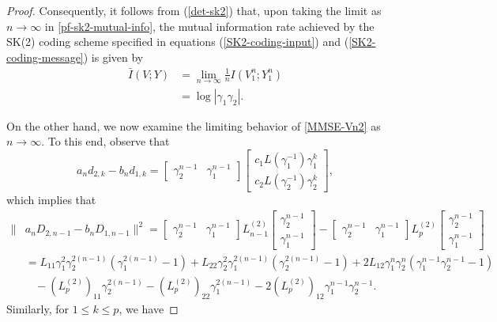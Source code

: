 \documentclass[12pt]{article}
\begin{document}
\begin{proof}
Consequently, it follows from (\ref{det-sk2}) that, upon taking the limit as $n\to\infty$ in \eqref{pf-sk2-mutual-info}, the mutual information rate achieved by the SK(2) coding scheme specified in equations (\ref{SK2-coding-input}) and (\ref{SK2-coding-message}) is given by
\begin{equation}\label{mutual-info-sk2-proof}
\begin{aligned}
            \bar{I}(V;Y)&=\lim_{n\to\infty}\frac{1}{n}I(V_1^n;Y_1^n)\\
            &= \log|\gamma_1 \gamma_2|.
\end{aligned}
\end{equation}

On the other hand, we now examine the limiting behavior of \eqref{MMSE-Vn2} as \(n \to \infty\). To this end, observe that
$$
a_nd_{2,k}-b_nd_{1,k}=\begin{bmatrix}\gamma_2^{n-1}&\gamma_1^{n-1}\end{bmatrix} \begin{bmatrix}
   c_1L(\gamma_1^{-1})\gamma_1^k \\[2pt]c_2L(\gamma_2^{-1})\gamma_2^k
\end{bmatrix},
$$
which implies that 
\begin{equation}\label{aD-bD}
\begin{aligned}
\|&a_nD_{2,n-1}-b_nD_{1,n-1} \|^2= \begin{bmatrix}
      \gamma_2^{n-1}&\gamma_1^{n-1}
\end{bmatrix}
L_{n-1}^{(2)}
\begin{bmatrix}
      \gamma_2^{n-1}\\[2pt]\gamma_1^{n-1}
\end{bmatrix} - \begin{bmatrix}\gamma_2^{n-1}&\gamma_1^{n-1}\end{bmatrix}L_p^{(2)}\begin{bmatrix}\gamma_2^{n-1}\\[2pt]\gamma_1^{n-1}\end{bmatrix}\\
&=L_{11}\gamma_1^2\gamma_2^{2(n-1)}(\gamma_1^{2(n-1)}-1) +L_{22}\gamma_2^2\gamma_1^{2(n-1)}(\gamma_2^{2(n-1)}-1)+2L_{12}\gamma_1^{n}\gamma_2^{n}(\gamma_1^{n-1}\gamma_2^{n-1}-1) \\[2pt]
&~~~~-(L_p^{(2)})_{11}\gamma_2^{2(n-1)}-(L_p^{(2)})_{22}\gamma_1^{2(n-1)}-2(L_p^{(2)})_{12}\gamma^{n-1}_1\gamma^{n-1}_2.
\end{aligned}
\end{equation}
Similarly, for $1\le k\le p$, we have

\end{proof}
\end{document}
